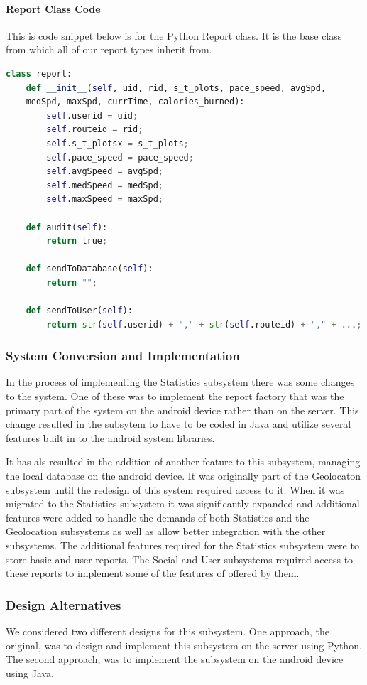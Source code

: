 \documentclass{article}
\begin{document}
\paragraph{Report Class Code}
This is code snippet below is for the Python Report class. It is the base class from which all of our report types inherit from.
\begin{lstlisting}[language=Python]
class report:
    def __init__(self, uid, rid, s_t_plots, pace_speed, avgSpd,
    medSpd, maxSpd, currTime, calories_burned):
        self.userid = uid;
        self.routeid = rid;
        self.s_t_plotsx = s_t_plots;
        self.pace_speed = pace_speed;
        self.avgSpeed = avgSpd;
        self.medSpeed = medSpd;
        self.maxSpeed = maxSpd;

    def audit(self):
        return true;

    def sendToDatabase(self):
        return "";

    def sendToUser(self):
        return str(self.userid) + "," + str(self.routeid) + "," + ...;
\end{lstlisting}

\subsubsection{System Conversion and Implementation}
In the process of implementing the Statistics subsystem there was some changes to the system. One of these was to implement the report factory that was the primary part of the system on the android device rather than on the server. This change resulted in the subsytem to have to be coded in Java and utilize several features built in to the android system libraries.

It has als resulted in the addition of another feature to this subsystem, managing the local database on the android device. It was originally part of the Geolocaton subsystem until the redesign of this system required access to it. When it was migrated to the Statistics subsystem it was significantly expanded and additional features were added to handle the demands of both Statistics and the Geolocation subsystems as well as allow better integration with the other subsystems. The additional features required for the Statistics subsystem were to store basic and user reports. The Social and User subsystems required access to these reports to implement some of the features of offered by them.

\subsubsection{Design Alternatives}
We considered two different designs for this subsystem. One approach, the original, was to design and implement this subsystem on the server using Python. The second approach, was to implement the subsystem on the android device using Java.
\end{document}
